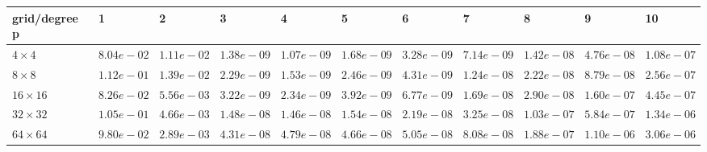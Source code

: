 \begin{tabular}{lllllllllll}
\hline
 grid/degree p   & 1          & 2          & 3          & 4          & 5          & 6          & 7          & 8          & 9          & 10         \\
\hline
 $4 \times 4$    & $8.04e-02$ & $1.11e-02$ & $1.38e-09$ & $1.07e-09$ & $1.68e-09$ & $3.28e-09$ & $7.14e-09$ & $1.42e-08$ & $4.76e-08$ & $1.08e-07$ \\
 $8 \times 8$    & $1.12e-01$ & $1.39e-02$ & $2.29e-09$ & $1.53e-09$ & $2.46e-09$ & $4.31e-09$ & $1.24e-08$ & $2.22e-08$ & $8.79e-08$ & $2.56e-07$ \\
 $16 \times 16$  & $8.26e-02$ & $5.56e-03$ & $3.22e-09$ & $2.34e-09$ & $3.92e-09$ & $6.77e-09$ & $1.69e-08$ & $2.90e-08$ & $1.60e-07$ & $4.45e-07$ \\
 $32 \times 32$  & $1.05e-01$ & $4.66e-03$ & $1.48e-08$ & $1.46e-08$ & $1.54e-08$ & $2.19e-08$ & $3.25e-08$ & $1.03e-07$ & $5.84e-07$ & $1.34e-06$ \\
 $64 \times 64$  & $9.80e-02$ & $2.89e-03$ & $4.31e-08$ & $4.79e-08$ & $4.66e-08$ & $5.05e-08$ & $8.08e-08$ & $1.88e-07$ & $1.10e-06$ & $3.06e-06$ \\
\hline
\end{tabular}
